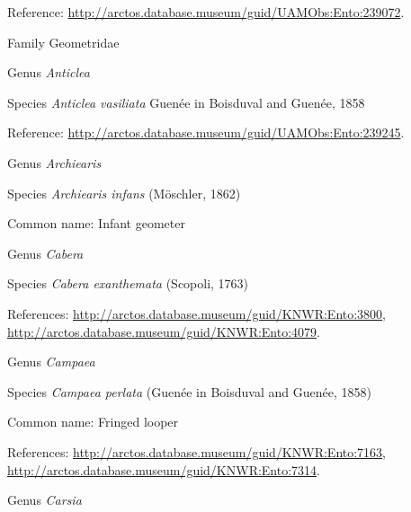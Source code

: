 \documentclass[9pt, article]{memoir}
\begin{document}
\begin{multicols}{2}
Reference: 
\url{http://arctos.database.museum/guid/UAMObs:Ento:239072}.

\vspace{6pt}\noindent\hspace{24pt}Family Geometridae


\vspace{6pt}\noindent\hspace{30pt}Genus \textit{Anticlea}


\vspace{6pt}\noindent\hspace{36pt}Species \textit{Anticlea vasiliata} Guenée in Boisduval and Guenée, 1858


Reference: 
\url{http://arctos.database.museum/guid/UAMObs:Ento:239245}.

\vspace{6pt}\noindent\hspace{30pt}Genus \textit{Archiearis}


\vspace{6pt}\noindent\hspace{36pt}Species \textit{Archiearis infans} (Möschler, 1862)


Common name: Infant geometer

\vspace{6pt}\noindent\hspace{30pt}Genus \textit{Cabera}


\vspace{6pt}\noindent\hspace{36pt}Species \textit{Cabera exanthemata} (Scopoli, 1763)


References: 
\url{http://arctos.database.museum/guid/KNWR:Ento:3800}, 
\url{http://arctos.database.museum/guid/KNWR:Ento:4079}.

\vspace{6pt}\noindent\hspace{30pt}Genus \textit{Campaea}


\vspace{6pt}\noindent\hspace{36pt}Species \textit{Campaea perlata} (Guenée in Boisduval and Guenée, 1858)


Common name: Fringed looper

References: 
\url{http://arctos.database.museum/guid/KNWR:Ento:7163}, 
\url{http://arctos.database.museum/guid/KNWR:Ento:7314}.

\vspace{6pt}\noindent\hspace{30pt}Genus \textit{Carsia}



\end{multicols}
\end{document}
